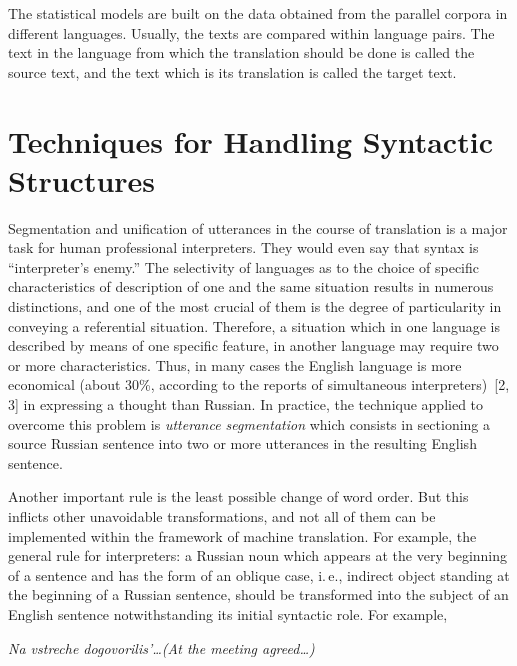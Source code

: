 \begin{multicols}{2}
     The statistical models are built on the data obtained from the parallel corpora 
in different languages. Usually, the texts are compared within language pairs. The 
text in the language from which the translation should be done is called the source 
text, and the text which is its translation is called the target text. 

\section{Techniques for Handling Syntactic Structures}

     \noindent
     Segmentation and unification of utterances in the course of translation is a 
major task for human professional interpreters. They would even say that syntax is 
``interpreter's enemy.'' The selectivity of languages as to the choice of specific 
characteristics of description of one and the same situation results in numerous 
distinctions, and one of the most crucial of them is the degree of particularity in 
conveying a referential situation. Therefore, a situation which in one language is 
described by means of one specific feature, in another language may require two or 
more characteristics. Thus, in many cases the English language is more economical 
(about 30\%, according to the reports of simultaneous interpreters)~[2, 3] 
in expressing a thought than Russian. In practice, the technique applied to 
overcome this problem is \textit{utterance segmentation} which consists in 
sectioning a source Russian sentence into two or more utterances in the resulting 
English sentence.
     
     Another important rule is the least possible change of word order. But this 
inflicts other unavoidable transformations, and not all of them can be implemented 
within the framework of machine translation. For example, the general rule for 
interpreters: a Russian noun which appears at the very beginning of a sentence and 
has the form of an oblique case, i.\,e., indirect object standing at the beginning of a 
Russian sentence, should be transformed into the subject of an English sentence 
notwithstanding its initial syntactic role. For example, 
{ %

}

     
\begin{center}\textit{Na vstreche dogovorilis'\ldots(At the meeting agreed\ldots) }
\end{center}
     

\end{multicols}
